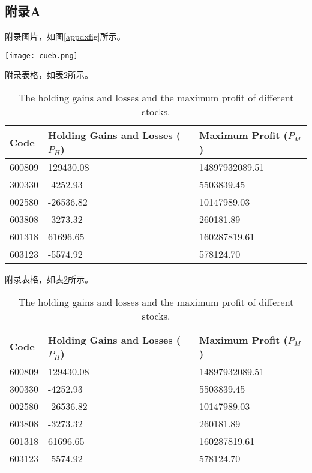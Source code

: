 \begin{appendix}
\chapter*{附录A}
\renewcommand{\thetable}{A.\arabic{table}}
\renewcommand{\thefigure}{A.\arabic{figure}}

附录图片，如图\ref{appdxfig}所示。
\begin{figure*}[htb]
\centering
\texttt{[image: cueb.png]}
\caption{插图样例}
\label{appdxfig}
\end{figure*}

附录表格，如表\ref{appdxtab}所示。
\begin{table}[htp]
\small
\centering
\setlength{\abovecaptionskip}{12pt}
\setlength{\belowcaptionskip}{6pt}
\caption{The holding gains and losses and the maximum profit of different stocks.}
\begin{tabular}{p{3cm}p{5cm}p{5cm}}\toprule[1.5pt]
Code& Holding Gains and Losses ($P_{H}$)& Maximum Profit ($P_{M}$)\\\midrule[1pt]
600809& 129430.08 & 14897932089.51 \\
300330& -4252.93 & 5503839.45 \\
002580& -26536.82 & 10147989.03 \\
603808& -3273.32 & 260181.89 \\
601318& 61696.65 & 160287819.61 \\
603123& -5574.92 & 578124.70\\
\bottomrule[1.5pt]
\end{tabular}
\label{appdxtab}
\end{table}

附录表格，如表\ref{appdxtab}所示。
\begin{table}[htp]
\small
\centering
\setlength{\abovecaptionskip}{12pt}
\setlength{\belowcaptionskip}{6pt}
\caption{The holding gains and losses and the maximum profit of different stocks.}
\begin{tabular}{p{3cm}p{5cm}p{5cm}}\toprule[1.5pt]
Code& Holding Gains and Losses ($P_{H}$)& Maximum Profit ($P_{M}$)\\\midrule[1pt]
600809& 129430.08 & 14897932089.51 \\
300330& -4252.93 & 5503839.45 \\
002580& -26536.82 & 10147989.03 \\
603808& -3273.32 & 260181.89 \\
601318& 61696.65 & 160287819.61 \\
603123& -5574.92 & 578124.70\\
\bottomrule[1.5pt]
\end{tabular}
\label{appdxtab}
\end{table}


\end{appendix}
